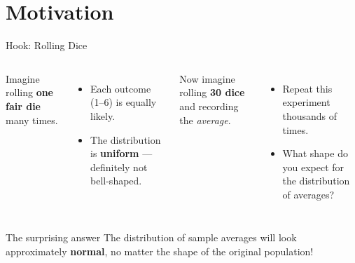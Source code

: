 \documentclass[aspectratio=169]{beamer}
\begin{document}
\section{Motivation}

\begin{frame}{Hook: Rolling Dice}
    \begin{columns}
        Imagine rolling \textbf{one fair die} many times.
        \begin{itemize}
            \item Each outcome (1--6) is equally likely.
            \item The distribution is \textbf{uniform} --- definitely not bell-shaped.
        \end{itemize}
        \bigskip
        Now imagine rolling \textbf{30 dice} and recording the \emph{average}.
        \begin{itemize}
            \item Repeat this experiment thousands of times.
            \item What shape do you expect for the distribution of averages?
        \end{itemize}
    \end{columns}
    \medskip
    \begin{alertblock}{The surprising answer}
        The distribution of sample averages will look approximately \textbf{normal},
        no matter the shape of the original population!
    \end{alertblock}
\end{frame}

\end{document}
